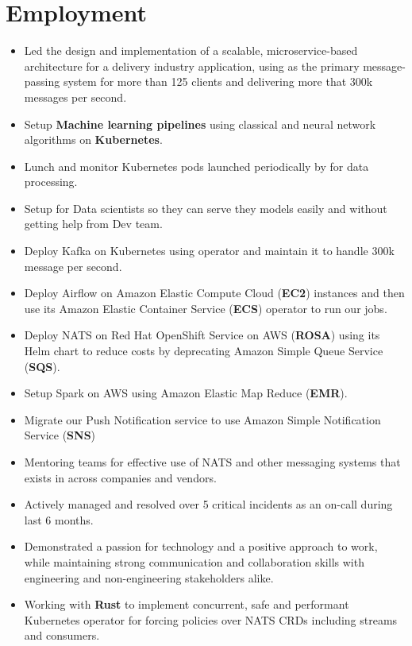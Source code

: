 \section{Employment}

\begin{itemize}
      \item Led the design and implementation of a scalable, microservice-based architecture for a delivery industry application,
            using  as the primary message-passing system for more than 125 clients and delivering
            more that 300k messages per second.
      \item Setup \textbf{Machine learning pipelines} using classical and neural network algorithms on \textbf{Kubernetes}.
      \item Lunch and monitor Kubernetes pods launched periodically by  for data processing.
      \item Setup  for Data scientists so they can serve they models easily and without getting help from Dev team.
      \item Deploy Kafka on Kubernetes using  operator and maintain it to handle 300k message per second.
      \item Deploy Airflow on Amazon Elastic Compute Cloud (\textbf{EC2}) instances and then use its Amazon Elastic Container Service (\textbf{ECS}) operator to run our jobs.
      \item Deploy NATS on Red Hat OpenShift Service on AWS (\textbf{ROSA})
            using its Helm chart to reduce costs by deprecating Amazon Simple Queue Service (\textbf{SQS}).
      \item Setup Spark on AWS using Amazon Elastic Map Reduce (\textbf{EMR}).
      \item Migrate our Push Notification service to use Amazon Simple Notification Service (\textbf{SNS})
      \item Mentoring teams for effective use of NATS and other messaging systems that exists in across companies and vendors.
      \item Actively managed and resolved over 5 critical incidents as an on-call during last 6 months.
      \item Demonstrated a passion for technology and a positive approach to work,
            while maintaining strong communication and collaboration skills with engineering
            and non-engineering stakeholders alike.
      \item Working with \textbf{Rust} to implement concurrent, safe and performant Kubernetes operator for forcing
            policies over NATS CRDs including streams and consumers.
\end{itemize}

